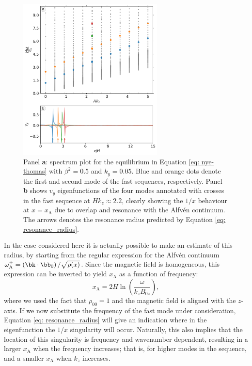 \begin{figure}[t]
  \centering
  \includegraphics[width=0.65\textwidth]{nye_thomas_kynonzero.png}
  \caption{
    Panel \textbf{a}: spectrum plot for the equilibrium in Equation \eqref{eq: nye-thomas} with $\beta^2 = 0.5$ and
    $k_y = 0.05$. Blue and orange dots denote the first and second mode of the fast sequences, respectively.
    Panel \textbf{b} shows $v_y$ eigenfunctions of the four modes annotated with crosses in the fast sequence at
    $H k_z \approx 2.2$, clearly showing the $1/x$ behaviour at $x = x_\text{A}$ due to overlap and resonance with the Alfv\'en continuum. The arrows denotes the resonance radius predicted by Equation \eqref{eq: resonance_radius}.
  }
  \label{fig: nye-thomas-kynonzero}
\end{figure}

In the case considered here it is actually possible to make an estimate of this radius, by starting from the regular expression for the Alfv\'en continuum $\omega_\text{A}^+ = \left(\bk \cdot \bb_0\right)/ \sqrt{\rho(x)}$. Since the magnetic field is homogeneous, this expression can be inverted to yield $x_\text{A}$ as a function of frequency:
\begin{equation} \label{eq: resonance_radius}
  x_\text{A} = 2 H \ln\left(\frac{\omega}{k_z B_{0z}}\right),
\end{equation}
where we used the fact that $\rho_{00} = 1$ and the magnetic field is aligned with the $z$-axis. If we now substitute the frequency of the fast mode under consideration, Equation \eqref{eq: resonance_radius} will give an indication where in the eigenfunction the $1/x$ singularity will occur. Naturally, this also implies that the location of this singularity is frequency and wavenumber dependent, resulting in a larger $x_\text{A}$ when the frequency increases; that is, for higher modes in the sequence, and a smaller $x_\text{A}$ when $k_z$ increases.

